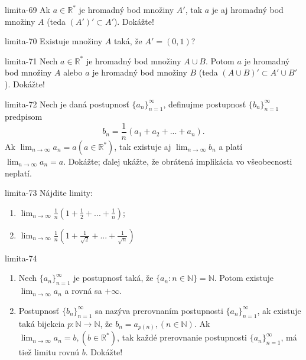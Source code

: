 \begin{defproblem}{limita-69}
Ak $a \in \mathbb{R^*}$ je hromadný bod množiny $A'$, tak $a$ je aj hromadný bod množiny $A$ (teda $(A')' \subset A'$). Dokážte!
\end{defproblem}

\begin{defproblem}{limita-70}
Existuje množiny $A$ taká, že $A'=(0,1)$?
\end{defproblem}

\begin{defproblem}{limita-71}
Nech $a \in \mathbb{R^*}$ je hromadný bod množiny $A \cup B$. Potom $a$ je hromadný bod množiny $A$ alebo $a$ je hromadný bod množiny $B$ (teda $(A \cup B)' \subset A' \cup B'$). Dokážte!
\end{defproblem}

\begin{defproblem}{limita-72}
Nech je daná postupnosť ${\{a_n\}}_{n=1}^\infty$, definujme postupnosť ${\{b_n\}}_{n=1}^\infty$ predpisom
$$b_n=\frac{1}{n}(a_1+a_2+...+a_n).$$
Ak $\lim_{n \rightarrow \infty} a_n=a (a \in \mathbb{R^*})$, tak existuje aj $\lim_{n \rightarrow \infty} b_n$ a platí $\lim_{n \rightarrow \infty} a_n=a$. Dokážte; ďalej ukážte, že obrátená implikácia vo všeobecnosti neplatí.
\end{defproblem}

\begin{defproblem}{limita-73}
Nájdite limity:
\begin{enumerate}
\item $\lim_{n \rightarrow \infty} \frac{1}{n}(1+\frac{1}{2}+...+\frac{1}{n})$;
\item $\lim_{n \rightarrow \infty} \frac{1}{n}(1+\frac{1}{\sqrt{2}}+...+\frac{1}{\sqrt{n}})$
\end{enumerate}
\end{defproblem}

\begin{defproblem}{limita-74}
\begin{enumerate}
\item Nech ${\{a_n\}}_{n=1}^\infty$ je postupnosť taká, že $\{ a_n: n \in \mathbb{N} \}=\mathbb{N}$. Potom existuje $\lim_{n \rightarrow \infty} a_n$ a rovná sa $+\infty$.
\item Postupnosť ${\{b_n\}}_{n=1}^\infty$ sa nazýva prerovnaním postupnosti ${\{a_n\}}_{n=1}^\infty$, ak existuje taká bijekcia $p: \mathbb{N} \rightarrow \mathbb{N}$, že $b_n=a_{p(n)},(n \in \mathbb{N})$. Ak $\lim_{n \rightarrow \infty} a_n=b,(b \in \mathbb{R^*})$, tak každé prerovnanie postupnosti ${\{a_n\}}_{n=1}^\infty$, má tiež limitu rovnú $b$. Dokážte!
\end{enumerate}
\end{defproblem}

